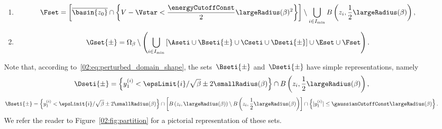 \begin{enumerate}[]
            \item{\begin{equation}\label{02:eq:Fset}\Fset = \left[\overline{\basin{z_0}}\cap \left\{V-\Vstar<\frac{\energyCutoffConst}2\largeRadius(\beta)^2\right\}\right] \setminus \bigcup_{i\in I_{\min}} B\left(z_i,\frac12\largeRadius(\beta)\right),\end{equation}}
            \item{\begin{equation}\label{02:eq:Gset}\Gset{\pm} = \Omega_\beta\setminus \left(\bigcup_{i\in I_{\min}} \left[\Aseti\cup\Bseti{\pm}\cup\Cseti\cup\Dseti{\pm}\right] \cup \Eset\cup\Fset\right).\end{equation}}
        \end{enumerate}

        Note that, according to~\eqref{02:eq:perturbed_domain_shape}, the sets~$\Bseti{\pm}$ and~$\Dseti{\pm}$ have simple representations, namely
        \[\Dseti{\pm} = \left\{y_1^{(i)}<\epsLimit{i}/\sqrt\beta\pm2\smallRadius(\beta)\right\} \cap B\left(z_i,\frac12\largeRadius(\beta)\right),\]
        \[\Bseti{\pm} =  \left\{y_1^{(i)}<\epsLimit{i}/\sqrt\beta\pm2\smallRadius(\beta)\right\}\cap \left[B\left(z_i,\largeRadius(\beta)\right)\setminus B\left(z_i,\frac12\largeRadius(\beta)\right)\right]\cap \left\{|y_1^{(i)}| \leq \gaussianCutoffConst\largeRadius(\beta)\right\}.\]
        We refer the reader to Figure~\ref{02:fig:partition} for a pictorial representation of these sets.
